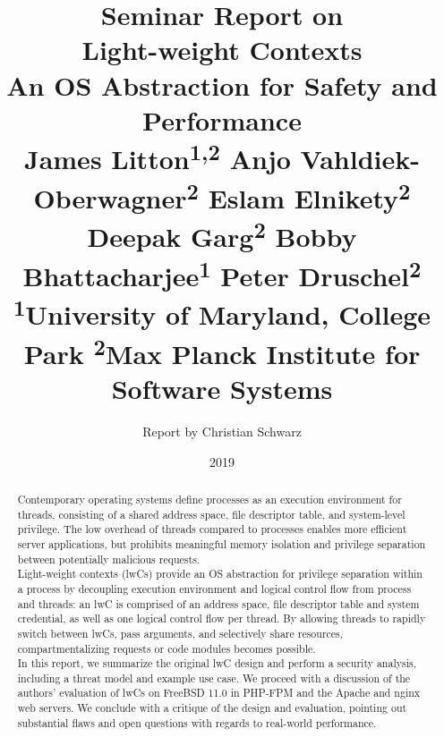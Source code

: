 \documentclass[10pt,twocolumn,a4paper]{article}
\begin{document}
\title{%
  {\normalfont \normalsize Seminar Report on}\\%
  Light-weight Contexts\\%
  {\normalfont \normalsize An OS Abstraction for Safety and Performance}\\%
  {\normalfont \small %
    James Litton\textsuperscript{1,2}
    Anjo Vahldiek-Oberwagner\textsuperscript{2}
    Eslam Elnikety\textsuperscript{2}
    Deepak Garg\textsuperscript{2}
    Bobby Bhattacharjee\textsuperscript{1}
    Peter Druschel\textsuperscript{2}
  }\\
  {\normalfont \small
    \textsuperscript{1}University of Maryland, College Park 
    \textsuperscript{2}Max Planck Institute for Software Systems
  }%
}
\author{Report by Christian Schwarz}
\date{2019}

\maketitle

\begin{abstract}
Contemporary operating systems define processes as an execution environment for threads, consisting of a shared address space, file descriptor table, and system-level privilege.
The low overhead of threads compared to processes enables more efficient server applications, but prohibits meaningful memory isolation and privilege separation between potentially malicious requests.\\
Light-weight contexts (lwCs) provide an OS abstraction for privilege separation within a process by decoupling execution environment and logical control flow from process and threads:
an lwC is comprised of an address space, file descriptor table and system credential, as well as one logical control flow per thread.
By allowing threads to rapidly switch between lwCs, pass arguments, and selectively share resources, compartmentalizing requests or code modules becomes possible.\\
In this report, we summarize the original lwC design and perform a security analysis, including a threat model and example use case.
We proceed with a discussion of the authors' evaluation of lwCs on FreeBSD 11.0 in PHP-FPM and the Apache and nginx web servers.
We conclude with a critique of the design and evaluation, pointing out substantial flaws and open questions with regards to real-world performance.
\end{abstract}
\end{document}
